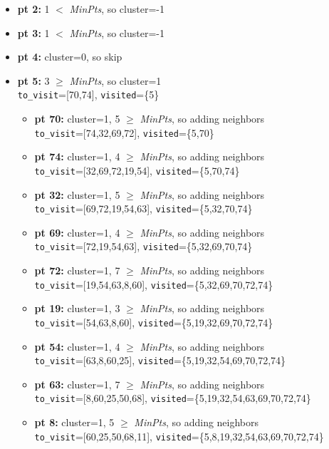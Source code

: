 \documentclass[11pt]{article}
\begin{document}
\begin{itemize}[label=$\star$]
			\item \textbf{pt 2:} 1 $<$ \textit{MinPts}, so cluster=-1
			\item \textbf{pt 3:} 1 $<$ \textit{MinPts}, so cluster=-1
			\item \textbf{pt 4:} cluster=0, so skip
			\item \textbf{pt 5:} 3 $\ge$ \textit{MinPts}, so cluster=1 \\ \texttt{to\_visit}=[70,74], \texttt{visited}=\{5\}
			\begin{itemize}[label=$\cdot$]
				\item \textbf{pt 70:} cluster=1, 5 $\ge$ \textit{MinPts}, so adding neighbors \\ \texttt{to\_visit}=[74,32,69,72], \texttt{visited}=\{5,70\}
				\item \textbf{pt 74:} cluster=1, 4 $\ge$ \textit{MinPts}, so adding neighbors \\ \texttt{to\_visit}=[32,69,72,19,54], \texttt{visited}=\{5,70,74\}
				\item \textbf{pt 32:} cluster=1, 5 $\ge$ \textit{MinPts}, so adding neighbors \\ \texttt{to\_visit}=[69,72,19,54,63], \texttt{visited}=\{5,32,70,74\}
				\item \textbf{pt 69:} cluster=1, 4 $\ge$ \textit{MinPts}, so adding neighbors \\ \texttt{to\_visit}=[72,19,54,63], \texttt{visited}=\{5,32,69,70,74\}
				\item \textbf{pt 72:} cluster=1, 7 $\ge$ \textit{MinPts}, so adding neighbors \\ \texttt{to\_visit}=[19,54,63,8,60], \texttt{visited}=\{5,32,69,70,72,74\}
				\item \textbf{pt 19:} cluster=1, 3 $\ge$ \textit{MinPts}, so adding neighbors \\ \texttt{to\_visit}=[54,63,8,60], \texttt{visited}=\{5,19,32,69,70,72,74\}
				\item \textbf{pt 54:} cluster=1, 4 $\ge$ \textit{MinPts}, so adding neighbors \\ \texttt{to\_visit}=[63,8,60,25], \texttt{visited}=\{5,19,32,54,69,70,72,74\}
				\item \textbf{pt 63:} cluster=1, 7 $\ge$ \textit{MinPts}, so adding neighbors \\ \texttt{to\_visit}=[8,60,25,50,68], \texttt{visited}=\{5,19,32,54,63,69,70,72,74\}
				\item \textbf{pt 8:} cluster=1, 5 $\ge$ \textit{MinPts}, so adding neighbors \\ \texttt{to\_visit}=[60,25,50,68,11], \texttt{visited}=\{5,8,19,32,54,63,69,70,72,74\}

\end{itemize}
\end{itemize}
\end{document}
